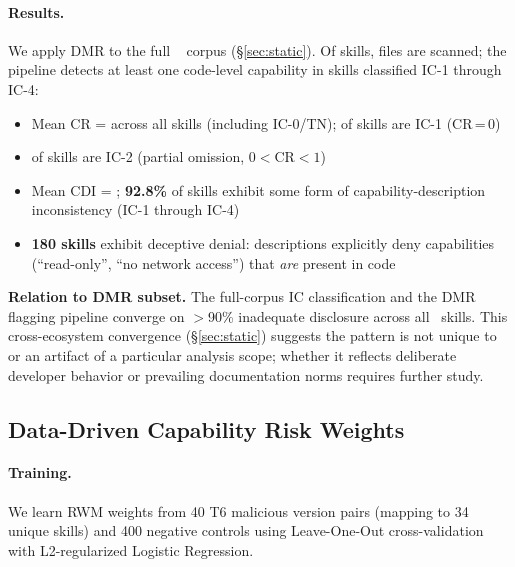 \paragraph{Results.}
We apply DMR to the full \NskillsDMR~\clawhub{} corpus (\S\ref{sec:static}).
Of \NskillsDMR skills, \textbf{\ResultFilesRead} files are scanned;
the pipeline detects at least one code-level capability in skills
classified IC-1 through IC-4:
\begin{itemize}
\item Mean CR = \ResultCR{} across all skills (including IC-0/TN);
      \textbf{\ResultICone{}} of skills are IC-1 (CR\,=\,0)
\item \textbf{\ResultICtwo{}} of skills are IC-2 (partial omission,
      $0 < \text{CR} < 1$)
\item Mean CDI = \ResultCDI{}; \textbf{92.8\%} of skills exhibit some
      form of capability-description inconsistency (IC-1 through IC-4)
\item \textbf{180 skills} exhibit deceptive denial: descriptions
      explicitly deny capabilities (``read-only'', ``no network access'')
      that \emph{are} present in code
\end{itemize}

\noindent
\textbf{Relation to DMR subset.}
The full-corpus IC classification and the DMR flagging pipeline
converge on $>$90\% inadequate disclosure across all \NskillsDMR{}~skills.
This cross-ecosystem convergence (\S\ref{sec:static}) suggests
the pattern is not unique to \clawhub{} or an artifact of a particular
analysis scope; whether it reflects deliberate developer behavior
or prevailing documentation norms requires further study.

\subsection{Data-Driven Capability Risk Weights}
\label{sec:riskweights}

\paragraph{Training.}
We learn RWM weights from 40 T6 malicious version pairs (mapping to 34 unique skills) and 400 negative controls using Leave-One-Out cross-validation with L2-regularized Logistic Regression.

